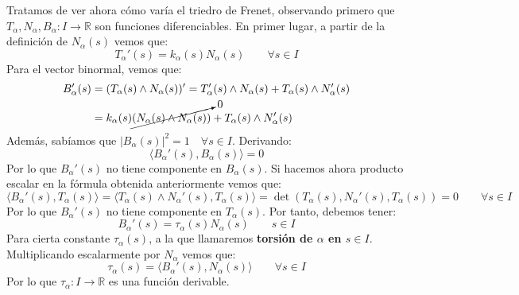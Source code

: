 \noindent
Tratamos de ver ahora cómo varía el triedro de Frenet, observando primero que $T_\alpha,N_\alpha,B_\alpha:I\to\mathbb{R}$ son funciones diferenciables. En primer lugar, a partir de la definición de $N_\alpha(s)$ vemos que:
\begin{equation*}
    \boxed{T_{\alpha}'(s) = k_\alpha(s) N_\alpha(s)}\qquad \forall s\in I
\end{equation*}
Para el vector binormal, vemos que: 
\begin{align*}
    B_\alpha'(s) &= (T_\alpha(s)\land N_\alpha(s))' = T_\alpha'(s)\land N_\alpha(s) + T_\alpha(s)\land N_\alpha'(s) \\
                 &= k_\alpha(s)\cancelto{0}{(N_\alpha(s)\land N_\alpha(s))} + T_\alpha(s)\land N_\alpha'(s)
\end{align*}
Además, sabíamos que $|B_\alpha(s)|^2 = 1\quad \forall s\in I$. Derivando:
\begin{equation*}
    \langle B_\alpha'(s),B_\alpha(s) \rangle = 0 
\end{equation*}
Por lo que $B_\alpha'(s)$ no tiene componente en $B_\alpha(s)$. Si hacemos ahora producto escalar en la fórmula obtenida anteriormente vemos que:
\begin{equation*} %
    \langle B_\alpha'(s),T_\alpha(s) \rangle  = \langle T_\alpha(s)\land N_\alpha'(s), T_\alpha(s) \rangle  = \det(T_\alpha(s), N_\alpha'(s), T_\alpha(s)) = 0 \qquad \forall s\in I
\end{equation*}
Por lo que $B_\alpha'(s)$ no tiene componente en $T_\alpha(s)$. Por tanto, debemos tener:
\begin{equation*}
    \boxed{B_\alpha'(s) = \tau_\alpha(s)N_\alpha(s)} \qquad s\in I
\end{equation*}
Para cierta constante $\tau_\alpha(s)$, a la que llamaremos \textbf{torsión de $\alpha$ en $s\in I$}. Multiplicando escalarmente por $N_\alpha$ vemos que:
\begin{equation*}
    \tau_\alpha(s) = \langle B_\alpha'(s),N_\alpha(s) \rangle \qquad \forall s\in I
\end{equation*}
Por lo que $\tau_\alpha:I\to\mathbb{R}$ es una función derivable.\\

